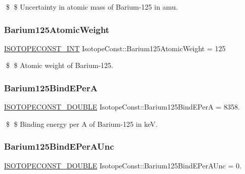 \$ \$ Uncertainty in atomic mass of Barium-\/125 in amu. \mbox{\label{group___isotope_const-_barium-_ba125_ga6c5d5e0f445148dd9a9c7720f50d980c}} 
\subsubsection{\texorpdfstring{Barium125\+Atomic\+Weight}{Barium125AtomicWeight}}
{\footnotesize\ttfamily \mbox{\hyperlink{group___isotope_const-_macros_ga5f18360b3e99483a35c32d789e62621c}{I\+S\+O\+T\+O\+P\+E\+C\+O\+N\+S\+T\+\_\+\+I\+NT}} Isotope\+Const\+::\+Barium125\+Atomic\+Weight = 125}

\$ \$ Atomic weight of Barium-\/125. \mbox{\label{group___isotope_const-_barium-_ba125_ga173a943aad97eaacf3e74d3d78cb22f2}} 
\subsubsection{\texorpdfstring{Barium125\+Bind\+E\+PerA}{Barium125BindEPerA}}
{\footnotesize\ttfamily \mbox{\hyperlink{group___isotope_const-_macros_ga8f45a7272ce02c0b4c65c44636ed719a}{I\+S\+O\+T\+O\+P\+E\+C\+O\+N\+S\+T\+\_\+\+D\+O\+U\+B\+LE}} Isotope\+Const\+::\+Barium125\+Bind\+E\+PerA = 8358.}

\$ \$ Binding energy per A of Barium-\/125 in keV. \mbox{\label{group___isotope_const-_barium-_ba125_gae1707c58dbe95f890a096333b67260e3}} 
\subsubsection{\texorpdfstring{Barium125\+Bind\+E\+Per\+A\+Unc}{Barium125BindEPerAUnc}}
{\footnotesize\ttfamily \mbox{\hyperlink{group___isotope_const-_macros_ga8f45a7272ce02c0b4c65c44636ed719a}{I\+S\+O\+T\+O\+P\+E\+C\+O\+N\+S\+T\+\_\+\+D\+O\+U\+B\+LE}} Isotope\+Const\+::\+Barium125\+Bind\+E\+Per\+A\+Unc = 0.}

